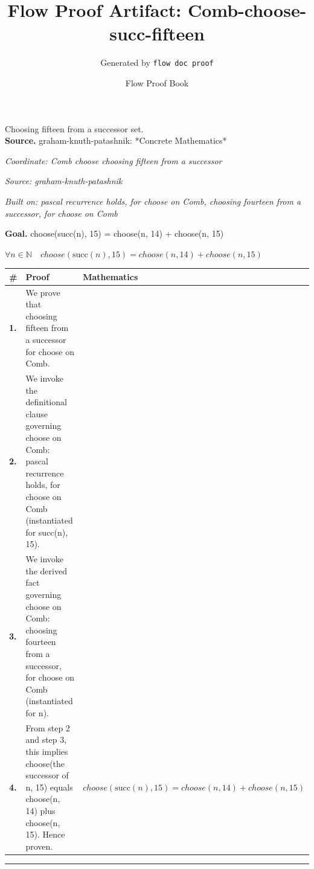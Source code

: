 \documentclass[11pt]{article}
\title{Flow Proof Artifact: Comb-choose-succ-fifteen}
\author{Generated by \texttt{flow doc proof}}
\date{Flow Proof Book}
\theoremstyle{definition}
\begin{document}
\maketitle
Choosing fifteen from a successor set.\\[0.5em]
\textbf{Source.} graham-knuth-patashnik: *Concrete Mathematics*\\[0.5em]
\bigskip
{}\par
\smallskip\noindent\textit{Coordinate: Comb \cdot choose \cdot choosing fifteen from a successor}\par
\smallskip\noindent\textit{Source: graham-knuth-patashnik}\par
\smallskip\noindent\textit{Built on: pascal recurrence holds, for choose on Comb, choosing fourteen from a successor, for choose on Comb}\par
\medskip
\noindent\textbf{Goal.} choose(succ(n), 15) = choose(n, 14) + choose(n, 15)\par
\noindent$\displaystyle \forall n \in \mathbb{N}\quad choose(\mathrm{succ}(n), 15) = choose(n, 14) + choose(n, 15)$\par
\medskip
\noindent
\begin{tabular}{@{} >{\raggedright\arraybackslash}p{} >{\raggedright\arraybackslash}p{} >{\raggedleft\arraybackslash}p{} @{}}
\textbf{\#} & \textbf{Proof} & \textbf{Mathematics} \\
\midrule
\textbf{1.} & We prove that choosing fifteen from a successor for choose on Comb. & \\[0.45em]
\textbf{2.} & We invoke the definitional clause governing choose on Comb: pascal recurrence holds, for choose on Comb (instantiated for succ(n), 15). & \\[0.45em]
\textbf{3.} & We invoke the derived fact governing choose on Comb: choosing fourteen from a successor, for choose on Comb (instantiated for n). & \\[0.45em]
\textbf{4.} & From step 2 and step 3, this implies choose(the successor of n, 15) equals choose(n, 14) plus choose(n, 15). Hence proven. & $\displaystyle choose(\mathrm{succ}(n), 15) = choose(n, 14) + choose(n, 15)$ \\[0.45em]
\bottomrule
\end{tabular}
\label{thm:Comb-choose-choosing_fifteen_from_a_successor}
\par\medskip\hrule
\end{document}
